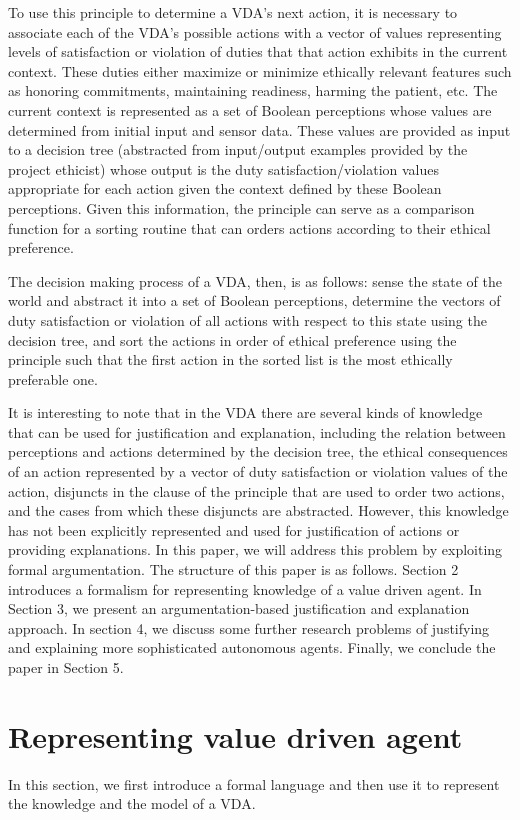 \documentclass[letterpaper]{article} %
\begin{document}
To use this principle to determine a VDA's next action, it is necessary to associate each of the VDA's possible actions with a vector of values representing levels of satisfaction or violation of duties that that action exhibits in the current context. These duties either maximize or minimize ethically relevant features such as honoring commitments, maintaining readiness, harming the patient, etc.   The current context is represented as a set of Boolean perceptions whose values are determined from initial input and sensor data. These values are provided as input to a decision tree (abstracted from input/output examples provided by the project ethicist) whose output is the duty satisfaction/violation values appropriate for each action given the context defined by these Boolean perceptions. Given this information, the principle can serve as a comparison function for a sorting routine that can orders actions according to their ethical preference.

The decision making process of a VDA, then, is as follows:  sense the state of the world and abstract it into a set of Boolean perceptions, determine the vectors of duty satisfaction or violation of all actions with respect to this state using the decision tree, and sort the actions in order of ethical preference using the principle such that the first action in the sorted list is the most ethically preferable one.

It is interesting to note that in the VDA there are several kinds of knowledge that can be used for justification and explanation, including the relation between perceptions and actions determined by the decision tree, the ethical consequences of an action represented by a vector of duty satisfaction or violation values of the action,  disjuncts in the clause of the principle that are used to order two actions, and the cases from which these disjuncts are abstracted. However, this knowledge has not been explicitly represented and used for justification of actions or providing explanations. In this paper, we will address this problem by exploiting formal argumentation. 
The structure of this paper is as follows. Section 2 introduces a formalism for representing knowledge of a value driven agent. In Section 3, we present an argumentation-based justification and explanation approach. In section 4, we discuss some further research problems of justifying and explaining more sophisticated autonomous agents. Finally, we conclude the paper in Section 5. 


\section{Representing value driven agent}
In this section, we first introduce a formal language and then use it to represent the knowledge and the model of a VDA. 
\end{document}
